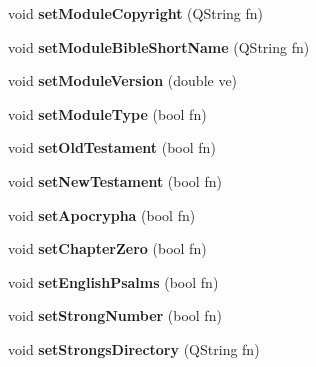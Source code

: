 \begin{DoxyCompactItemize}
\item 
\hypertarget{classConfig_ac24bb69bba15ada7bc4bc031bd3e50f3}{
void {\bfseries setModuleCopyright} (QString fn)}
\label{classConfig_ac24bb69bba15ada7bc4bc031bd3e50f3}

\item 
\hypertarget{classConfig_a7501cd0b3b1dc7acc3e83472b73b7e95}{
void {\bfseries setModuleBibleShortName} (QString fn)}
\label{classConfig_a7501cd0b3b1dc7acc3e83472b73b7e95}

\item 
\hypertarget{classConfig_a4ed505f285b3da43a5ce5c7a97adf38e}{
void {\bfseries setModuleVersion} (double ve)}
\label{classConfig_a4ed505f285b3da43a5ce5c7a97adf38e}

\item 
\hypertarget{classConfig_a312d91925755d15b61859c4029c313d8}{
void {\bfseries setModuleType} (bool fn)}
\label{classConfig_a312d91925755d15b61859c4029c313d8}

\item 
\hypertarget{classConfig_a66fcacdcec861a4ffa084636b4e0fb50}{
void {\bfseries setOldTestament} (bool fn)}
\label{classConfig_a66fcacdcec861a4ffa084636b4e0fb50}

\item 
\hypertarget{classConfig_adc179a8e2125214efd4702962cac5f04}{
void {\bfseries setNewTestament} (bool fn)}
\label{classConfig_adc179a8e2125214efd4702962cac5f04}

\item 
\hypertarget{classConfig_a04074ed327d6ccd9b99f9bf515ab9c6f}{
void {\bfseries setApocrypha} (bool fn)}
\label{classConfig_a04074ed327d6ccd9b99f9bf515ab9c6f}

\item 
\hypertarget{classConfig_ae97824eec255ab7ac35f1e4134e1f70d}{
void {\bfseries setChapterZero} (bool fn)}
\label{classConfig_ae97824eec255ab7ac35f1e4134e1f70d}

\item 
\hypertarget{classConfig_a18aab8a61037e8feaafb2b4a7926d40a}{
void {\bfseries setEnglishPsalms} (bool fn)}
\label{classConfig_a18aab8a61037e8feaafb2b4a7926d40a}

\item 
\hypertarget{classConfig_a1d2ab525cc8d8cdbbecdcaedb813adca}{
void {\bfseries setStrongNumber} (bool fn)}
\label{classConfig_a1d2ab525cc8d8cdbbecdcaedb813adca}

\item 
\hypertarget{classConfig_aa3ef95f5c702ef726d15fe9e40334c81}{
void {\bfseries setStrongsDirectory} (QString fn)}
\label{classConfig_aa3ef95f5c702ef726d15fe9e40334c81}


\end{DoxyCompactItemize}
